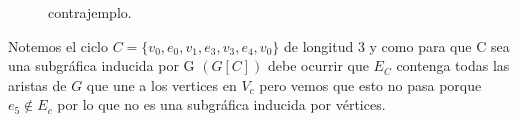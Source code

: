 \begin{enumerate}
\begin{figure}[!hbt]
\begin{center}

              \end{center}
              \caption{contrajemplo.}
          \end{figure}

          Notemos el ciclo $C=\{v_0,e_0,v_1,e_3,v_3,e_4,v_0\}$ de longitud 3 y como para que C sea una subgráfica inducida por G $(G\left[C\right])$ debe ocurrir que $E_C$ contenga todas las aristas de $G$ que une a los vertices en $V_c$ pero vemos que esto no pasa porque $e_5\notin E_c$ por lo que no es una subgráfica inducida por vértices.
\end{enumerate}